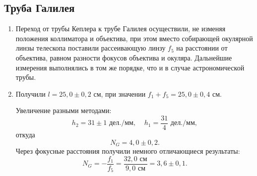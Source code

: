 \documentclass[a4paper,12pt]{article}
\begin{document}
	\subsection*{Труба Галилея}
	\begin{enumerate}
	\item Переход от трубы Кеплера к трубе Галилея осуществили, не изменяя положения коллиматора и объектива, при этом вместо собирающей окулярной линзы телескопа поставили рассеивающую линзу $f_5$ на расстоянии от объектива, равном разности фокусов объектива и окуляра. Дальнейшие измерения выполнялись в том же порядке, что и в случае астрономической трубы.
	
	\item Получили $l = 25{,}0\pm0{,}2$ см, при значении $f_1 + f_5 = 25{,}0\pm0{,}4$ см. 
	
	Увеличение разными методами:
	\begin{equation*}
		h_2 = 31\pm1\text{ дел./мм},\;\;\;\; h_1 = \dfrac{31}{4}\text{ дел./мм},
	\end{equation*}
	откуда
	\begin{equation*}
	N_G = 4{,}0\pm0{,}2.
	\end{equation*}
	Через фокусные расстояния получили немного отличающиеся результаты:
	\begin{equation*}
		N_G = -\dfrac{f_1}{f_5} = \dfrac{32{,}0\text{ см}}{9{,}0\text{ см}} = 3{,}6\pm0{,}1.
	\end{equation*}
	
	\end{enumerate}
	
\end{document}
